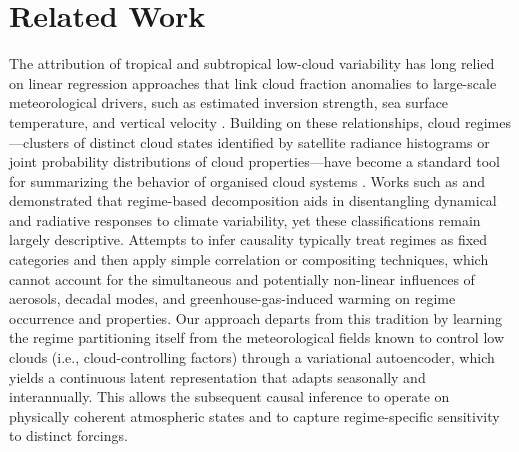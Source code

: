 \documentclass{article}
\begin{document}
\section{Related Work}

The attribution of tropical and subtropical low-cloud variability has long relied on linear regression approaches that link cloud fraction anomalies to large-scale meteorological drivers, such as estimated inversion strength, sea surface temperature, and vertical velocity \cite{klein1997relationship,myers2021observational}. Building on these relationships, cloud regimes—clusters of distinct cloud states identified by satellite radiance histograms or joint probability distributions of cloud properties—have become a standard tool for summarizing the behavior of organised cloud systems \cite{jakob2003objective,tselioudis2021regimes}. Works such as \cite{oreopoulos2011global} and \cite{mcdonald2016variability} demonstrated that regime-based decomposition aids in disentangling dynamical and radiative responses to climate variability, yet these classifications remain largely descriptive. Attempts to infer causality typically treat regimes as fixed categories and then apply simple correlation or compositing techniques, which cannot account for the simultaneous and potentially non-linear influences of aerosols, decadal modes, and greenhouse-gas-induced warming on regime occurrence and properties. Our approach departs from this tradition by learning the regime partitioning itself from the meteorological fields known to control low clouds (i.e., cloud-controlling factors) through a variational autoencoder, which yields a continuous latent representation that adapts seasonally and interannually. This allows the subsequent causal inference to operate on physically coherent atmospheric states and to capture regime-specific sensitivity to distinct forcings.
\end{document}
